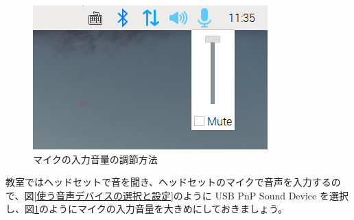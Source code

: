 \begin{figure}[H]
    \begin{center}
        \includegraphics[width=\linewidth]{images/microphone_volume.png}
        \caption{マイクの入力音量の調節方法}
        \label{microphone_volume}
    \end{center}
\end{figure}


教室ではヘッドセットで音を聞き、ヘッドセットのマイクで音声を入力するので、図\ref{使う音声デバイスの選択と設定}のように USB PnP Sound Device を選択し、図\ref{microphone_volume}のようにマイクの入力音量を大きめにしておきましょう。
